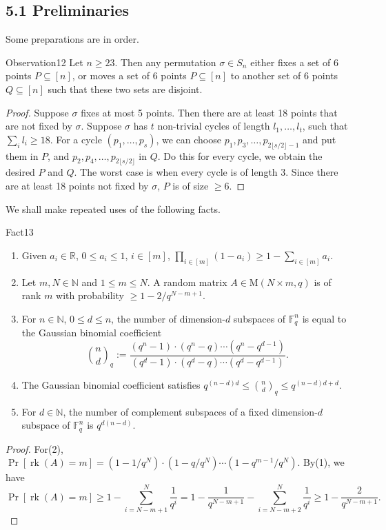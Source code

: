 \subsection*{5.1 Preliminaries}
Some preparations are in order.
\begin{authorclaim}{Observation12}
Let $n\ge23$. Then any permutation $\sigma\in S_n$ either fixes a set of 6 points $P\subseteq[n]$, or moves a set of 6 points $P\subseteq[n]$ to another set of 6 points $Q\subseteq[n]$ such that these two sets are disjoint.
\end{authorclaim}
\begin{proof}
Suppose $\sigma$ fixes at most 5 points. Then there are at least 18 points that are not fixed by $\sigma$. Suppose $\sigma$ has $t$ non-trivial cycles of length $l_1,\ldots,l_t$, such that $\sum_i l_i\ge18$. For a cycle $(p_1,\ldots,p_s)$, we can choose $p_1,p_3,\ldots,p_{2\lfloor s/2\rfloor-1}$ and put them in $P$, and $p_2,p_4,\ldots,p_{2\lfloor s/2\rfloor}$ in $Q$. Do this for every cycle, we obtain the desired $P$ and $Q$. The worst case is when every cycle is of length 3. Since there are at least 18 points not fixed by $\sigma$, $P$ is of size $\ge6$.
\end{proof}
We shall make repeated uses of the following facts.
\begin{authorclaim}{Fact13}
\begin{enumerate}
\item Given $a_i\in\mathbb R$, $0\le a_i\le1$, $i\in[m]$, $\prod_{i\in[m]}(1-a_i)\ge1-\sum_{i\in[m]}a_i$.
\item Let $m,N\in\mathbb N$ and $1\le m\le N$. A random matrix $A\in\mathrm M(N\times m,q)$ is of rank $m$ with probability $\ge1-2/q^{N-m+1}$.
\item For $n\in\mathbb N$, $0\le d\le n$, the number of dimension-$d$ subspaces of $\mathbb F_q^n$ is equal to the Gaussian binomial coefficient
\[\binom nd_q:=\frac{(q^n-1)\cdot(q^n-q)\cdots(q^n-q^{d-1})}{(q^d-1)\cdot(q^d-q)\cdots(q^d-q^{d-1})}.\]
\item The Gaussian binomial coefficient satisfies $q^{(n-d)d}\le\binom nd_q\le q^{(n-d)d+d}$.
\item For $d\in\mathbb N$, the number of complement subspaces of a fixed dimension-$d$ subspace of $\mathbb F_q^n$ is $q^{d(n-d)}$.
\end{enumerate}
\end{authorclaim}
\begin{proof}
For(2), $\Pr[\operatorname{rk}(A)=m]=(1-1/q^N)\cdot(1-q/q^N)\cdots(1-q^{m-1}/q^N)$. By(1), we have
\[\Pr[\operatorname{rk}(A)=m]\ge1-\sum_{i=N-m+1}^N\frac1{q^i}=1-\frac1{q^{N-m+1}}-\sum_{i=N-m+2}^N\frac1{q^i}\ge1-\frac2{q^{N-m+1}}.\]
\end{proof}
